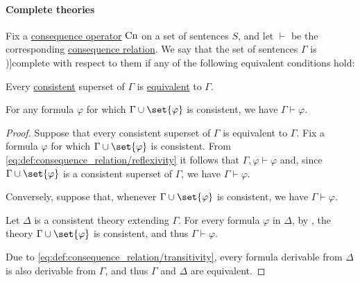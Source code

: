 \paragraph{Complete theories}

\begin{definition}\label{def:complete_set_of_sentences}
  Fix a \hyperref[def:consequence_operator]{consequence operator} \( \op{Cn} \) on a set of sentences \( S \), and let \( {\vdash} \) be the corresponding \hyperref[def:consequence_relation]{consequence relation}. We say that the set of sentences \( \Gamma \) is \term[ru=полное (множество формул) (\cite[def. 1.3.16]{Герасимов2011})]{complete} with respect to them if any of the following equivalent conditions hold:
  \begin{thmenum}
     Every \hyperref[def:consistent_set_of_sentences]{consistent} superset of \( \Gamma \) is \hyperref[def:logical_theory/equivalent]{equivalent} to \( \Gamma \).

     For any formula \( \varphi \) for which \( \Gamma \cup \set{ \varphi } \) is consistent, we have \( \Gamma \vdash \varphi \).
  \end{thmenum}
\end{definition}
\begin{proof}
   Suppose that every consistent superset of \( \Gamma \) is equivalent to \( \Gamma \). Fix a formula \( \varphi \) for which \( \Gamma \cup \set{ \varphi } \) is consistent. From \eqref{eq:def:consequence_relation/reflexivity} it follows that \( \Gamma, \varphi \vdash \varphi \) and, since \( \Gamma \cup \set{ \varphi } \) is a consistent superset of \( \Gamma \), we have \( \Gamma \vdash \varphi \).

   Conversely, suppose that, whenever \( \Gamma \cup \set{ \varphi } \) is consistent, we have \( \Gamma \vdash \varphi \).

  Let \( \Delta \) is a consistent theory extending \( \Gamma \). For every formula \( \varphi \) in \( \Delta \), by , the theory \( \Gamma \cup \set{ \varphi } \) is consistent, and thus \( \Gamma \vdash \varphi \).

  Due to \eqref{eq:def:consequence_relation/transitivity}, every formula derivable from \( \Delta \) is also derivable from \( \Gamma \), and thus \( \Gamma \) and \( \Delta \) are equivalent.
\end{proof}

